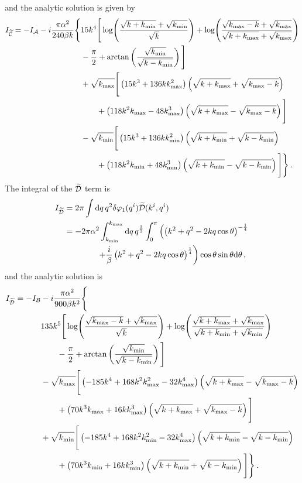 % 
and the analytic solution is given by
% 
\begin{align}
\label{eq:cint-soln-num}
I_{\wt{\C}} = -I_\A -i\frac{\pi\alpha^2}{240 \beta k}\Bigg\{ 
        &15 k^4 \Bigg[ \log\Biggl(\frac{\sqrt{k+\kmin} + \sqrt{\kmin}}{\sqrt{k}}
                            \Biggr)
         + \log\Biggl( \frac{\sqrt{\kmax-k} + \sqrt{\kmax}}{\sqrt{k+\kmax}
                        +\sqrt{\kmax}}\Biggr) \nonumber \\
        &-\frac{\pi}{2} + \arctan\left( \frac{\sqrt{\kmin}}{\sqrt{k-\kmin}}\right)
        \Bigg] \nonumber\\
% 
        &+\sqrt{\kmax}\Bigg[ \left(15k^3 + 136k\kmax^2 \right)\left(\sqrt{k+\kmax} +
          \sqrt{\kmax-k}\right) \nonumber \\
        &\qquad +\left(118k^2\kmax -48\kmax^3\right) \left(\sqrt{k+\kmax} -
         \sqrt{\kmax -k} \right) \Bigg] \nonumber \\
% 
        &-\sqrt{\kmin}\Bigg[ \left(15k^3 + 136k\kmin^2 \right)\left(\sqrt{k+\kmin} +
          \sqrt{k-\kmin}\right) \nonumber \\
        &\qquad +\left(118k^2\kmin +48\kmin^3\right) \left(\sqrt{k+\kmin} -
         \sqrt{k-\kmin} \right) \Bigg] \Bigg\} \,.
\end{align}
The integral of the $\widetilde{\mathcal{D}}$ term is 
% 
\begin{align}
 \label{eq:dint-num}
I_{\wt{\D}} &= 2\pi \int \d q\, q^2 \dvp1(\qvi) \wt{\D}(\kvi, \qvi) \\
% 
 &= -2\pi\alpha^2 \int_{\kmin}^{\kmax} \d q\, q^{\frac{3}{2}} \int_0^\pi 
     \left( \left(k^2 + q^2 -2kq \cos\theta\right)^{-\frac{1}{4}} \right.\nonumber\\
% 
        &\qquad\qquad\left.+\frac{i}{\beta}\left(k^2 + q^2 -2kq
\cos\theta\right)^{\frac{1}{4}}
        \right) \cos\theta\sin\theta \d \theta\,,
\end{align}
% 
and the analytic solution is
% 
\begin{align}
\label{eq:dint-soln-num}
I_{\wt{\D}} = -I_\B &-i\frac{\pi\alpha^2}{900\beta k^2}\Bigg\{ \nonumber \\
        &135 k^5 \Bigg[ \log\Biggl(\frac{\sqrt{\kmax-k} + \sqrt{\kmax}}{\sqrt{k}}
                            \Biggr)
         + \log\Biggl( \frac{\sqrt{k+\kmax} +\sqrt{\kmax}}{\sqrt{k+\kmin} +
                          \sqrt{\kmin}}\Biggr) \nonumber \\
        &\qquad -\frac{\pi}{2} + \arctan\left(
\frac{\sqrt{\kmin}}{\sqrt{k-\kmin}}\right)
        \Bigg] \nonumber\\
% 
        &-\sqrt{\kmax}\Bigg[ \left(-185k^4 + 168k^2\kmax^2-32\kmax^4
            \right)\left(\sqrt{k+\kmax} - \sqrt{\kmax-k}\right) \nonumber \\
        &\qquad +\left(70k^3\kmax +16k\kmax^3\right) \left(\sqrt{k+\kmax} +
         \sqrt{\kmax -k} \right) \Bigg] \nonumber \\
% 
        &+\sqrt{\kmin}\Bigg[ \left(-185k^4 + 168k^2\kmin^2 -32\kmax^4
            \right)\left(\sqrt{k+\kmin} - \sqrt{k-\kmin}\right) \nonumber \\
        &\qquad +\left(70k^3\kmin +16k\kmin^3\right) \left(\sqrt{k+\kmin} +
         \sqrt{k-\kmin} \right) \Bigg] \Bigg\} \,.
\end{align}
